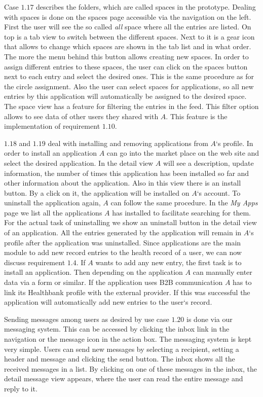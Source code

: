 Case $1.17$ describes the folders, which are called spaces in the prototype. Dealing with spaces is done on the spaces page accessible via the navigation on the left. First the user will see the so called \emph{all} space where all the entries are listed. On top is a tab view to switch between the different spaces. Next to it is a gear icon that allows to change which spaces are shown in the tab list and in what order. The more the menu behind this button allows creating new spaces. In order to assign different entries to these spaces, the user can click on the spaces button next to each entry and select the desired ones. This is the same procedure as for the circle assignment. Also the user can select spaces for applications, so all new entries by this application will automatically be assigned to the desired space. The space view has a feature for filtering the entries in the feed. This filter option allows to see data of other users they shared with $A$. This feature is the implementation of requirement $1.10$.

$1.18$ and $1.19$ deal with installing and removing applications from $A$`s profile. In order to install an application $A$ can go into the market place on the web site and select the desired application. In the detail view $A$ will see a description, update information, the number of times this application has been installed so far and other information about the application. Also in this view there is an install button. By a click on it, the application will be installed on $A$`s account. To uninstall the application again, $A$ can follow the same procedure. In the \emph{My Apps} page we list all the applications $A$ has installed to facilitate searching for them. For the actual task of uninstalling we show an uninstall button in the detail view of an application. All the entries generated by the application will remain in $A$`s profile after the application was uninstalled. \newline
Since applications are the main module to add new record entries to the health record of a user, we can now discuss requirement $1.4$. If $A$ wants to add any new entry, the first task is to install an application. Then depending on the application $A$ can manually enter data via a form or similar. If the application uses B2B communication $A$ has to link its Healthbank profile with the external provider. If this was successful the application will automatically add new entries to the user`s record.

Sending messages among users as desired by use case $1.20$ is done via our messaging system. This can be accessed by clicking the inbox link in the navigation or the message icon in the action box. The messaging system is kept very simple. Users can send new messages by selecting a recipient, setting a header and message and clicking the send button. The inbox shows all the received messages in a list. By clicking on one of these messages in the inbox, the detail message view appears, where the user can read the entire message and reply to it. 

